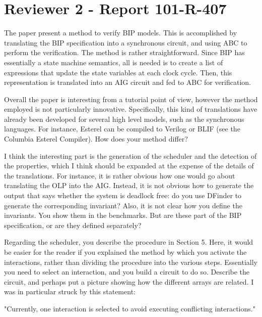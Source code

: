 \section{Reviewer 2 - Report 101-R-407}
%
%
The paper present a method to verify BIP models. This is accomplished by
translating the BIP specification into a synchronous circuit, and using ABC to
perform the verification. The method is rather straightforward. Since BIP has
essentially a state machine semantics, all is needed is to create a list of
expressions that update the state variables at each clock cycle. Then, this
representation is translated into an AIG circuit and fed to ABC for
verification.

Overall the paper is interesting from a tutorial point of view, however the
method employed is not particularly innovative. Specifically, this kind of
translations have already been developed for several high level models, such
as the synchronous languages. For instance, Esterel can be compiled to Verilog
or BLIF (see the Columbia Esterel Compiler). How does your method differ?


I think the interesting part is the generation of the scheduler and the
detection of the properties, which I think should be expanded at the expense
of the details of the translations. For instance, it is rather obvious how one
would go about translating the OLP into the AIG. Instead, it is not obvious
how to generate the output that says whether the system is deadlock free: do
you use DFinder to generate the corresponding invariant? Also, it is not clear
how you define the invariants. You show them in the benchmarks. But are these
part of the BIP specification, or are they defined separately?



Regarding the scheduler, you describe the procedure in Section 5. Here, it
would be easier for the reader if you explained the method by which you
activate the interactions, rather than dividing the procedure into the various
steps. Essentially you need to select an interaction, and you build a circuit
to do so. Describe the circuit, and perhaps put a picture showing how the
different arrays are related. I was in particular struck by this statement:

"Currently, one interaction is selected to avoid executing conflicting
interactions."

